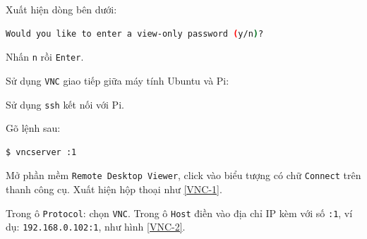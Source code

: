 \begin{list}{--}{}
\begin{list}{+}{}
Xuất hiện dòng bên dưới:
\begin{lstlisting}[language=bash]
Would you like to enter a view-only password (y/n)?
\end{lstlisting}
Nhấn \verb|n| rồi \verb|Enter|.
\end{list}
\item Sử dụng \verb|VNC| giao tiếp giữa máy tính Ubuntu và Pi:
\begin{list}{+}{}
\item Sử dụng \verb|ssh| kết nối với Pi.
\item Gõ lệnh sau: 
\begin{lstlisting}[language=bash]
$ vncserver :1
\end{lstlisting}
\item Mở phần mềm \verb|Remote Desktop Viewer|, click vào biểu tượng có chữ \verb|Connect| trên thanh công cụ. Xuất hiện hộp thoại như \ref{VNC-1}.
\item Trong ô \verb|Protocol|: chọn \verb|VNC|.  Trong ô \verb|Host| điền vào địa chỉ IP kèm với số \verb|:1|, ví dụ: \verb|192.168.0.102:1|, như hình \ref{VNC-2}.
\begin{figure}[!h]
\begin{center}
	 \hspace{1cm}

\end{center}
\end{figure}
\end{list}
\end{list}
